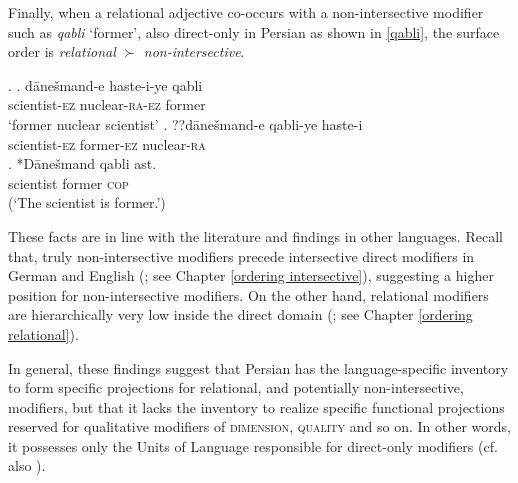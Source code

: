 \documentclass [output=book,colorlinks,citecolor=brown]{langscibook}
\begin{document}
Finally, when a relational adjective co-occurs with a non-intersective modifier such as \textit{qabli} `former’, also direct-only in Persian as shown in \ref{qabli}, the surface order is \textit{relational} $\succ$ \textit{non-intersective}. %

\ex. \label{nuclearformer} \ag. dānešmand-e haste-i-ye qabli\\
scientist-\textsc{ez} nuclear-\textsc{ra-ez} former\\
`former nuclear scientist'
\bg. ??dānešmand-e qabli-ye haste-i\\
scientist-\textsc{ez} former-\textsc{ez} nuclear-\textsc{ra}\\

\exg. *Dānešmand qabli ast.\\
scientist former \textsc{cop}\\
(`The scientist is former.’) \label{qabli}

These facts are in line with the literature and findings in other languages. Recall that, truly non-intersective modifiers precede intersective direct modifiers in German and English (\citealt{trost:2006:das, panayidou:2013:in}; see Chapter \ref{ordering intersective}), suggesting a higher position for non-intersective modifiers. On the other hand, relational modifiers are hierarchically very low inside the direct domain (\citealt{bortolotto:2016:RA}; see Chapter \ref{ordering relational}). %

In general, these findings suggest that Persian has the language-specific inventory to form specific projections for relational, and potentially non-intersective, modifiers, but that it lacks the inventory to realize specific functional projections reserved for qualitative modifiers of \textsc{dimension}, \textsc{quality} and so on. In other words, it possesses only the Units of Language responsible for direct-only modifiers (cf. also \citealt[18]{kahne:2014:revisiting}).
\end{document}
